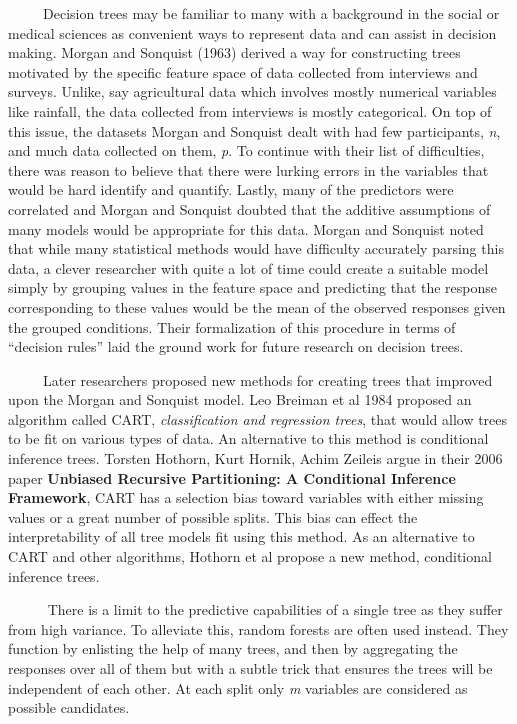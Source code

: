 \documentclass[12pt,twoside]{reedthesis}
\begin{document}
  ~~~~~Decision trees may be familiar to many with a background in the
  social or medical sciences as convenient ways to represent data and can
  assist in decision making. Morgan and Sonquist (1963) derived a way for
  constructing trees motivated by the specific feature space of data
  collected from interviews and surveys. Unlike, say agricultural data
  which involves mostly numerical variables like rainfall, the data
  collected from interviews is mostly categorical. On top of this issue,
  the datasets Morgan and Sonquist dealt with had few participants,
  \emph{n}, and much data collected on them, \emph{p}. To continue with
  their list of difficulties, there was reason to believe that there were
  lurking errors in the variables that would be hard identify and
  quantify. Lastly, many of the predictors were correlated and Morgan and
  Sonquist doubted that the additive assumptions of many models would be
  appropriate for this data. Morgan and Sonquist noted that while many
  statistical methods would have difficulty accurately parsing this data,
  a clever researcher with quite a lot of time could create a suitable
  model simply by grouping values in the feature space and predicting that
  the response corresponding to these values would be the mean of the
  observed responses given the grouped conditions. Their formalization of
  this procedure in terms of ``decision rules'' laid the ground work for
  future research on decision trees.
  
  ~~~~~Later researchers proposed new methods for creating trees that
  improved upon the Morgan and Sonquist model. Leo Breiman et al 1984
  proposed an algorithm called CART, \emph{classification and regression
  trees}, that would allow trees to be fit on various types of data. An
  alternative to this method is conditional inference trees. Torsten
  Hothorn, Kurt Hornik, Achim Zeileis argue in their 2006 paper
  \textbf{Unbiased Recursive Partitioning: A Conditional Inference
  Framework}, CART has a selection bias toward variables with either
  missing values or a great number of possible splits. This bias can
  effect the interpretability of all tree models fit using this method. As
  an alternative to CART and other algorithms, Hothorn et al propose a new
  method, conditional inference trees.
  
  ~~~~~ There is a limit to the predictive capabilities of a single tree
  as they suffer from high variance. To alleviate this, random forests are
  often used instead. They function by enlisting the help of many trees,
  and then by aggregating the responses over all of them but with a subtle
  trick that ensures the trees will be independent of each other. At each
  split only \emph{m} variables are considered as possible candidates.
  
\end{document}
